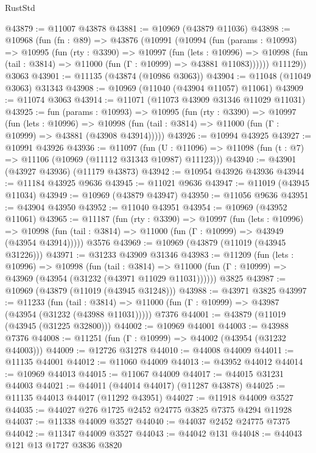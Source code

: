 \begin{lexlean}{RustStd}
\begin{coremodule}
@43879 := @11007 @43878
@43881 := @10969 (@43879 @11036)
@43898 := @10968
    (fun (fn : @89) =>
    @43876
      (@10991
        (@10994
          (fun (params : @10993) =>
          @10995
            (fun (rty : @3390) =>
            @10997
              (fun (lets : @10996) =>
              @10998 (fun (tail : @3814) => @11000 (fun (Γ : @10999) => @43881 @11083))))))
        @11129))
    @3063
@43901 := @11135 (@43874 (@10986 @3063))
@43904 := @11048 (@11049 @3063) @31343
@43908 := @10969 (@11040 (@43904 @11057) @11061)
@43909 := @11074 @3063
@43914 := @11071 (@11073 @43909 @31346 @11029 @11031)
@43925 := fun (params : @10993) =>
  @10995
    (fun (rty : @3390) =>
    @10997
      (fun (lets : @10996) =>
      @10998 (fun (tail : @3814) => @11000 (fun (Γ : @10999) => @43881 (@43908 @43914)))))
@43926 := @10994 @43925
@43927 := @10991 @43926
@43936 := @11097
    (fun (U : @11096) => @11098 (fun (t : @7) => @11106 (@10969 (@11112 @31343 @10987) @11123)))
@43940 := @43901 (@43927 @43936) (@11179 @43873)
@43942 := @10954 @43926 @43936
@43944 := @11184 @43925 @9636
@43945 := @11021 @9636
@43947 := @11019 (@43945 @11034)
@43949 := @10969 (@43879 @43947)
@43950 := @11056 @9636
@43951 := @43904 @43950
@43952 := @11040 @43951
@43954 := @10969 (@43952 @11061)
@43965 := @11187
    (fun (rty : @3390) =>
    @10997
      (fun (lets : @10996) =>
      @10998 (fun (tail : @3814) => @11000 (fun (Γ : @10999) => @43949 (@43954 @43914)))))
    @3576
@43969 := @10969 (@43879 (@11019 (@43945 @31226)))
@43971 := @31233 @43909 @31346
@43983 := @11209
    (fun (lets : @10996) =>
    @10998
      (fun (tail : @3814) =>
      @11000 (fun (Γ : @10999) => @43969 (@43954 (@31232 (@43971 @11029 @11031))))))
    @3825
@43987 := @10969 (@43879 (@11019 (@43945 @31248)))
@43988 := @43971 @3825
@43997 := @11233
    (fun (tail : @3814) => @11000 (fun (Γ : @10999) => @43987 (@43954 (@31232 (@43988 @11031)))))
    @7376
@44001 := @43879 (@11019 (@43945 (@31225 @32800)))
@44002 := @10969 @44001
@44003 := @43988 @7376
@44008 := @11251 (fun (Γ : @10999) => @44002 (@43954 (@31232 @44003)))
@44009 := @12726 @31278
@44010 := @44008 @44009
@44011 := @11135 @44001
@44012 := @11060 @44009
@44013 := @43952 @44012
@44014 := @10969 @44013
@44015 := @11067 @44009
@44017 := @44015 @31231 @44003
@44021 := @44011 (@44014 @44017) (@11287 @43878)
@44025 := @11135 @44013 @44017 (@11292 @43951)
@44027 := @11918 @44009 @3527
@44035 := @44027 @276 @1725 @2452 @24775 @3825 @7375 @4294 @11928
@44037 := @11338 @44009 @3527
@44040 := @44037 @2452 @24775 @7375
@44042 := @11347 @44009 @3527
@44043 := @44042 @131
@44048 := @44043 @121 @13 @1727 @3836 @3820

\end{coremodule}
\end{lexlean}
